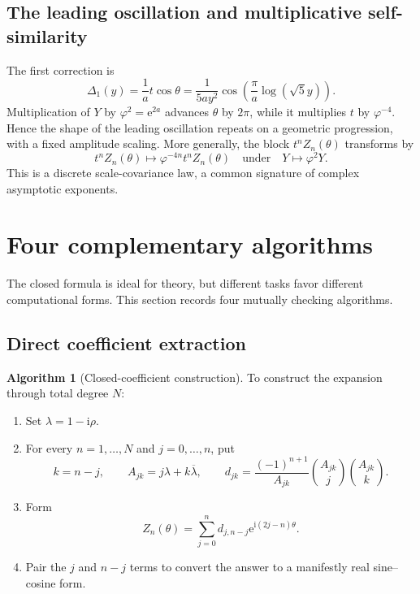 \documentclass[11pt,oneside]{article}
\theoremstyle{plain}
\theoremstyle{definition}
\newtheorem{algorithm}[theorem]{Algorithm}
\theoremstyle{remark}
\newcommand{\e}{\mathrm{e}}
\newcommand{\ii}{\mathrm{i}}
\newcommand{\phig}{\varphi}
\begin{document}
\subsection{The leading oscillation and multiplicative self-similarity}

The first correction is
\begin{equation}
 \Delta_1(y)=\frac{1}{a}t\cos\theta
 =\frac{1}{5ay^2}
 \cos\left(\frac{\pi}{a}\log(\sqrt5y)\right).
 \label{eq:leading-oscillation}
\end{equation}
Multiplication of \(Y\) by \(\phig^2=\e^{2a}\) advances \(\theta\) by
\(2\pi\), while it multiplies \(t\) by \(\phig^{-4}\).  Hence the shape of
the leading oscillation repeats on a geometric progression, with a fixed
amplitude scaling.  More generally, the block \(t^nZ_n(\theta)\) transforms by
\begin{equation}
 t^nZ_n(\theta)\longmapsto
 \phig^{-4n}t^nZ_n(\theta)
 \quad\text{under}\quad Y\longmapsto\phig^2Y.
 \label{eq:discrete-scale-law}
\end{equation}
This is a discrete scale-covariance law, a common signature of complex
asymptotic exponents.

\section{Four complementary algorithms}
\label{sec:algorithms}

The closed formula is ideal for theory, but different tasks favor different
computational forms.  This section records four mutually checking algorithms.

\subsection{Direct coefficient extraction}

\begin{algorithm}[Closed-coefficient construction]
\label{alg:closed}
To construct the expansion through total degree \(N\):
\begin{enumerate}
\item Set \(\lambda=1-\ii\rho\).
\item For every \(n=1,\ldots,N\) and \(j=0,\ldots,n\), put
\[
 k=n-j,
 \qquad A_{jk}=j\lambda+k\overline\lambda,
 \qquad
 d_{jk}=\frac{(-1)^{n+1}}{A_{jk}}
 \binom{A_{jk}}j\binom{A_{jk}}k.
\]
\item Form
\[
 Z_n(\theta)=\sum_{j=0}^nd_{j,n-j}\e^{\ii(2j-n)\theta}.
\]
\item Pair the \(j\) and \(n-j\) terms to convert the answer to a manifestly
real sine--cosine form.
\end{enumerate}
\end{algorithm}
\end{document}
